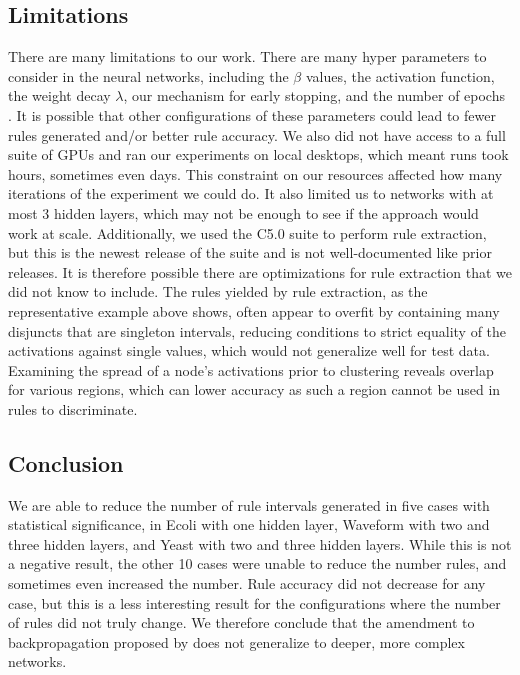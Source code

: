 \subsection{Limitations}
\label{sec:limitations}
There are many limitations to our work. There are many
hyper parameters to consider in the neural networks, including the
$\beta$ values, the activation function, the weight decay $\lambda$,
our mechanism for early stopping, and the number of epochs
. It is possible that other configurations of these
parameters could lead to fewer rules generated and/or better rule
accuracy. We also did not have access to a full suite of GPUs
and ran our experiments on local desktops, which meant runs took
hours, sometimes even days. This constraint on our resources affected
how many iterations of the experiment we could do. It also limited us to networks with at most 3 hidden layers, which may not be enough
to see if the approach would work at scale. Additionally, we
used the C5.0 suite to perform rule extraction, but this is the newest
release of the suite and is not well-documented like prior releases. It is
therefore possible there are optimizations for rule extraction that we
did not know to include. The rules yielded by rule extraction, as the representative example above shows, often appear to overfit by containing many disjuncts that are singleton intervals, reducing conditions to strict equality of the activations against single values, which would not generalize well for test data. Examining the spread of a node's activations prior to clustering reveals overlap for various regions, which can lower accuracy as such a region cannot be used in rules to discriminate.

\subsection{Conclusion}
\label{sec:conclusion}

We are able to reduce the number of rule intervals generated in five cases with statistical significance, in Ecoli with one hidden layer, Waveform with two and three hidden layers, and Yeast with two and three hidden layers. While this is not a negative result, the other 10 cases were unable to reduce the number rules, and sometimes even increased the number. Rule accuracy did not decrease for any case, but this is a less interesting result for the configurations where the number of rules did not truly change. We therefore conclude that the amendment to backpropagation proposed by \cite{thuan11} does not generalize to deeper, more complex networks. 

